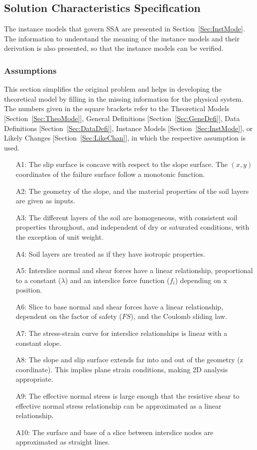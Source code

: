 \documentclass[12pt]{article}
\begin{document}
\subsection{Solution Characteristics Specification}
\label{Sec:SoluCharSpec}
The instance models that govern SSA are presented in Section~\ref{Sec:InstMode}. The information to understand the meaning of the instance models and their derivation is also presented, so that the instance models can be verified.
\subsubsection{Assumptions}
\label{Sec:Assu}
This section simplifies the original problem and helps in developing the theoretical model by filling in the missing information for the physical system. The numbers given in the square brackets refer to the Theoretical Models [Section~\ref{Sec:TheoMode}], General Definitions [Section~\ref{Sec:GeneDefi}], Data Definitions [Section~\ref{Sec:DataDefi}], Instance Models [Section~\ref{Sec:InstMode}], or Likely Changes [Section~\ref{Sec:LikeChan}], in which the respective assumption is used.
\begin{itemize}
\item[A1:]The slip surface is concave with respect to the slope surface. The $(x,y)$ coordinates of the failure surface follow a monotonic function.
\item[A2:]The geometry of the slope, and the material properties of the soil layers are given as inputs.
\item[A3:]The different layers of the soil are homogeneous, with consistent soil properties throughout, and independent of dry or saturated conditions, with the exception of unit weight.
\item[A4:]Soil layers are treated as if they have isotropic properties.
\item[A5:]Interslice normal and shear forces have a linear relationship, proportional to a constant ($\lambda{}$) and an interslice force function ($f_{i}$) depending on x position.
\item[A6:]Slice to base normal and shear forces have a linear relationship, dependent on the factor of safety ($FS$), and the Coulomb sliding law.
\item[A7:]The stress-strain curve for interslice relationships is linear with a constant slope.
\item[A8:]The slope and slip surface extends far into and out of the geometry (z coordinate). This implies plane strain conditions, making 2D analysis appropriate.
\item[A9:]The effective normal stress is large enough that the resistive shear to effective normal stress relationship can be approximated as a linear relationship.
\item[A10:]The surface and base of a slice between interslice nodes are approximated as straight lines.
\end{itemize}
\end{document}
